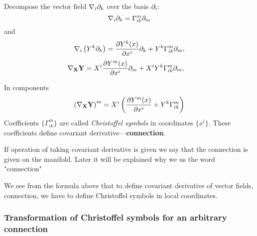 \documentclass[12pt]{article}
\theoremstyle{theorem}
\numberwithin{equation}{section}
\begin{document}
 Decompose the vector field  $\nabla_i \partial_k$ over the basis $\partial_i$:
             \begin{equation}\label{cristoffelinlocalcoordiantes1}
                \nabla_i \partial_k=\Gamma_{ik}^m\partial_m
              \end{equation}
             and
\begin{equation}\label{covariantderivative}
    \nabla_i\left({Y^k \partial_k}\right)=
    {\partial Y^k(x)\over \partial x^i}{\partial}_k+Y^k\Gamma_{ik}^m\partial_m,
\end{equation}
   \begin{equation}\label{covariantderivative2}
    \nabla_{\bf X} {\bf Y}=
    X^i{\partial Y^m(x)\over \partial x^i}\partial_m+X^iY^k\Gamma_{ik}^m\partial_m,\quad
    \end{equation}

    In components
           \begin{equation}\label{covderivincomponents}
             \left( \nabla_{\bf X} {\bf Y}\right)^m=
    X^i\left({\partial Y^m(x)\over \partial x^i}+Y^k\Gamma_{ik}^m\right)
           \end{equation}
    Coefficients $\{\Gamma_{ik}^m\}$ are called {\it Christoffel symbols} in coordinates $\{x^i\}$.
These coefficients define covariant derivative---{\bf connection}.


If operation of taking covariant derivative is given we say that the connection is given on the manifold.
Later it will be explained why we us the word "connection"


We see from the formula above that to define covariant derivative of vector fields, connection,
we have to define Christoffel symbols in local coordinates.

\subsubsection {Transformation of Christoffel symbols for an arbitrary connection}
\end{document}
